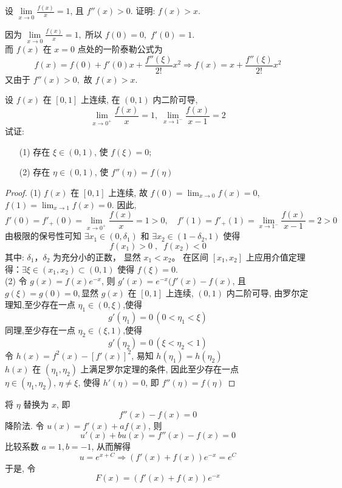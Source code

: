 \documentclass[color=green,titlestyle=hang]{elegantbook}%
\begin{document}
\begin{example}
设 $\lim\limits_{x\to 0}\frac {f(x)}{x}=1$, 且 $f''(x)>0.$ 证明: $f(x)> x$.
\end{example}\begin{solution}
因为 $\lim\limits_{x\to 0}\frac {f(x)}{x}=1,$ 所以 $f(0)=0,\,\, f'(0)=1.$\\
而 $f(x)$ 在 $x=0$ 点处的一阶泰勒公式为
\[f(x)=f(0)+f'(0)x+\frac{f''(\xi)}{2!}x^2\Longrightarrow f(x)=x+\frac{f''(\xi)}{2!}x^2 \]
又由于 $f''(x)>0,$ 故 $f(x)>x$.	
\end{solution}

\begin{example}
设 $f(x)$ 在 $[0,1]$ 上连续, 在 $(0,1)$ 内二阶可导,
\[\lim_{x\to0^+}\frac{f(x)}{x}=1,\;\lim_{x\to1^-}\frac{f(x)}{x-1}=2\] 试证: 
\begin{enumerate}
	\item[(1)] 存在 $\xi\in(0,1)$, 使 $f(\xi)=0$;
	\item[(2)] 存在 $\eta\in(0,1)$, 使 $f''(\eta)=f(\eta)$
\end{enumerate}
\end{example}\begin{proof}(1)
$f(x)$ 在 $[0,1]$ 上连续, 故 $f(0)=\lim_{x\to0}f(x)=0$, $f(1)=\lim_{x\to1}f(x)=0$. 因此, 
\[f'(0)=f'_+(0)=\lim_{x\to0^+}\frac{f(x)}{x}=1>0,\quad f'(1)=f'_+(1)=\lim_{x\to1^-}\frac{f(x)}{x-1}=2>0\]
由极限的保号性可知 $\exists x_1\in(0,\delta_1)$ 和 $\exists x_2\in(1-\delta_2,1)$ 使得
\[f(x_1)>0\;,\;\; f(x_2)<0 \]
其中: $\delta_1$，$\delta_2$ 为充分小的正数，
显然 $x_1<x_2$。  在区间 $[x_1,x_2]$ 上应用介值定理得：$\exists\xi\in(x_1,x_2)\subset(0,1)$ 使得 $f(\xi)=0$. \\
(2) 令 $g(x)=f(x)e^{-x}$, 则 $g'(x)=e^{-x}(f'(x)-f(x)$, 且 $g(\xi)=g(0)=0$,\,显然 $g(x)$ 在 $[0,1]$ 上连续, $(0,1)$ 内二阶可导, 由罗尔定理知,至少存在一点 $\eta_1\in(0,\xi)$,使得 
\[g'(\eta_1)=0\,(0<\eta_1<\xi)\]
同理,至少存在一点 $\eta_2\in(\xi,1)$,使得 
\[g'(\eta_2)=0\,(\xi<\eta_2<1)\]
令 $h(x)=f^2(x)-[f'(x)]^2$, 易知 $h(\eta_1)=h(\eta_2)$\\
$h(x)$ 在 $(\eta_1,\eta_2)$ 上满足罗尔定理的条件, 因此至少存在一点 $\eta\in(\eta_1,\eta_2),\,\eta\neq\xi$, 使得 $h'(\eta)=0$, 即 $f''(\eta)=f(\eta)$
\end{proof}\begin{remark}
将 $\eta$ 替换为 $x$, 即
\[f''(x)-f(x)=0\]
降阶法. 令 $u(x)=f'(x)+af(x)$, 则
\[u'(x)+bu(x)=f''(x)-f(x)=0\]
比较系数 $a=1,b=-1$, 从而解得
\[u=e^{x+C}\Rightarrow (f'(x)+f(x))e^{-x}=e^C\]
于是, 令
\[F(x)=(f'(x)+f(x))e^{-x}\]
\end{remark}
\end{document}
